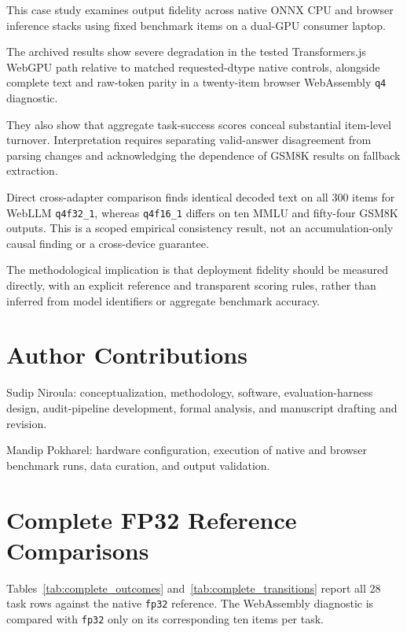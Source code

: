 \documentclass[conference]{IEEEtran}
\newcommand{\fp}{\texttt{fp32}}
\newcommand{\qfour}{\texttt{q4}}
\newcommand{\mlchalf}{\texttt{q4f16\_1}}
\newcommand{\mlcfull}{\texttt{q4f32\_1}}
\begin{document}
This case study examines output fidelity across native
ONNX CPU and browser inference stacks using fixed benchmark
items on a dual-GPU consumer laptop.

The archived results show severe degradation in the tested
Transformers.js WebGPU path relative to matched
requested-dtype native controls, alongside complete text
and raw-token parity in a twenty-item browser WebAssembly
\qfour{} diagnostic.

They also show that aggregate task-success scores conceal
substantial item-level turnover.
Interpretation requires separating valid-answer disagreement
from parsing changes and acknowledging the dependence of
GSM8K results on fallback extraction.

Direct cross-adapter comparison finds identical decoded
text on all 300 items for WebLLM \mlcfull{}, whereas
\mlchalf{} differs on ten MMLU and fifty-four GSM8K outputs.
This is a scoped empirical consistency result, not an
accumulation-only causal finding or a cross-device guarantee.

The methodological implication is that deployment fidelity
should be measured directly, with an explicit reference and
transparent scoring rules, rather than inferred from model
identifiers or aggregate benchmark accuracy.


\section*{Author Contributions}

Sudip Niroula: conceptualization, methodology, software,
evaluation-harness design, audit-pipeline development,
formal analysis, and manuscript drafting and revision.

Mandip Pokharel: hardware configuration, execution of native
and browser benchmark runs, data curation, and output
validation.


\appendices

\section{Complete FP32 Reference Comparisons}
\label{app:complete}

Tables~\ref{tab:complete_outcomes}
and~\ref{tab:complete_transitions} report all 28 task rows
against the native \fp{} reference. The WebAssembly diagnostic
is compared with \fp{} only on its corresponding ten items per
task.
\end{document}
